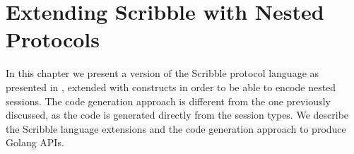 \documentclass[12pt,twoside]{report}
\begin{document}


\chapter{Extending Scribble with Nested Protocols}
In this chapter we present a version of the Scribble protocol language as presented in \cite{scribble}, extended with constructs in order to be able to encode nested sessions. The code generation approach is different from the one previously discussed, as the code is generated directly from the session types. We describe the Scribble language extensions and the code generation approach to produce Golang APIs.
\end{document}
